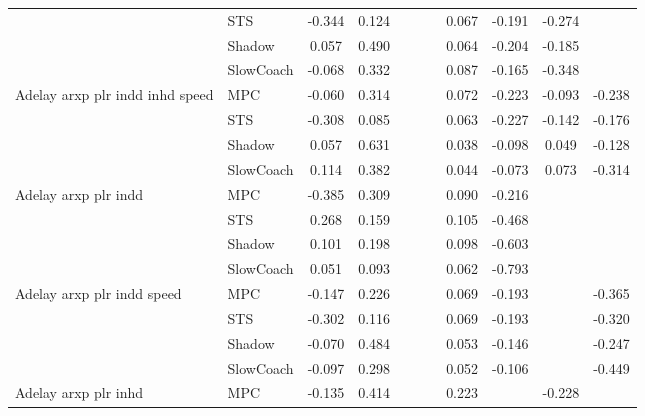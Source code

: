 \begin{tabular}{|l|l|*{9}{c|}}
                              & STS &   -0.344 &     0.124 &        &     &     &  0.067 &  -0.191 &  -0.274 &       \\
                              & Shadow &    0.057 &     0.490 &        &     &     &  0.064 &  -0.204 &  -0.185 &       \\
                              & SlowCoach &   -0.068 &     0.332 &        &     &     &  0.087 &  -0.165 &  -0.348 &       \\
\midrule
Adelay arxp plr indd inhd speed    & MPC &   -0.060 &     0.314 &        &     &     &  0.072 &  -0.223 &  -0.093 &   -0.238 \\
                              & STS &   -0.308 &     0.085 &        &     &     &  0.063 &  -0.227 &  -0.142 &   -0.176 \\
                              & Shadow &    0.057 &     0.631 &        &     &     &  0.038 &  -0.098 &   0.049 &   -0.128 \\
                              & SlowCoach &    0.114 &     0.382 &        &     &     &  0.044 &  -0.073 &   0.073 &   -0.314 \\
\midrule
Adelay arxp plr indd    & MPC &   -0.385 &     0.309 &        &     &     &  0.090 &  -0.216 &      &       \\
                              & STS &    0.268 &     0.159 &        &     &     &  0.105 &  -0.468 &      &       \\
                              & Shadow &    0.101 &     0.198 &        &     &     &  0.098 &  -0.603 &      &       \\
                              & SlowCoach &    0.051 &     0.093 &        &     &     &  0.062 &  -0.793 &      &       \\
\midrule
Adelay arxp plr indd speed    & MPC &   -0.147 &     0.226 &        &     &     &  0.069 &  -0.193 &      &   -0.365 \\
                              & STS &   -0.302 &     0.116 &        &     &     &  0.069 &  -0.193 &      &   -0.320 \\
                              & Shadow &   -0.070 &     0.484 &        &     &     &  0.053 &  -0.146 &      &   -0.247 \\
                              & SlowCoach &   -0.097 &     0.298 &        &     &     &  0.052 &  -0.106 &      &   -0.449 \\
\midrule
Adelay arxp plr inhd    & MPC &   -0.135 &     0.414 &        &     &     &  0.223 &      &  -0.228 &       \\

\end{tabular}
